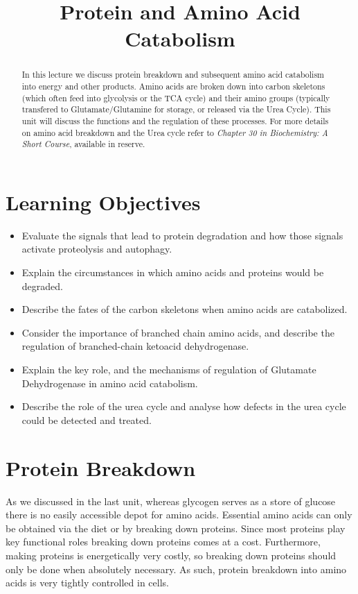 \documentclass{tufte-handout}
\title{Protein and Amino Acid Catabolism}
\author{}
\date{}  %
\begin{document}
\maketitle%

\begin{abstract}
\noindent In this lecture we discuss protein breakdown and subsequent amino acid catabolism into energy and other products.  Amino acids are broken down into carbon skeletons (which often feed into glycolysis or the TCA cycle) and their amino groups (typically transfered to Glutamate/Glutamine for storage, or released via the Urea Cycle).  This unit will discuss the functions and the regulation of these processes.  For more details on amino acid breakdown and the Urea cycle refer to \emph{Chapter 30 in Biochemistry: A Short Course}, available in reserve\cite{Berg2015}.
\end{abstract}

\tableofcontents

\pagebreak
\section{Learning Objectives}

\begin{itemize}
\item Evaluate the signals that lead to protein degradation and how those signals activate proteolysis and autophagy.
\item Explain the circumstances in which amino acids and proteins would be degraded.
\item Describe the fates of the carbon skeletons when amino acids are catabolized.
\item Consider the importance of branched chain amino acids, and describe the regulation of branched-chain ketoacid dehydrogenase.
\item Explain the key role, and the mechanisms of regulation of Glutamate Dehydrogenase in amino acid catabolism.
\item Describe the role of the urea cycle and analyse how defects in the urea cycle could be detected and treated.
\end{itemize}

\section{Protein Breakdown}

As we discussed in the last unit, whereas glycogen serves as a store of glucose there is no easily accessible depot for amino acids.  Essential amino acids can only be obtained via the diet or by breaking down proteins. Since most proteins play key functional roles breaking down proteins comes at a cost.  Furthermore, making proteins is energetically very costly, so breaking down proteins should only be done when absolutely necessary.  As such, protein breakdown into amino acids is very tightly controlled in cells.
\end{document}
